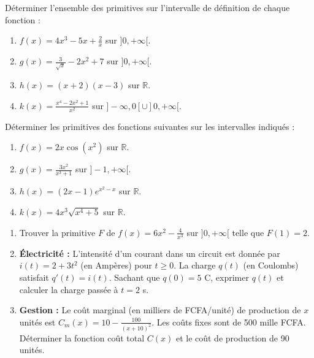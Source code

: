 \documentclass[11pt]{article}
\begin{document}
\begin{exercice}
Déterminer l'ensemble des primitives sur l'intervalle de définition de chaque fonction :
\begin{enumerate}
    \item $f(x) = 4x^3 - 5x + \frac{2}{x}$ sur $]0, +\infty[$.
    \item $g(x) = \frac{3}{\sqrt{x}} - 2x^2 + 7$ sur $]0, +\infty[$.
    \item $h(x) = (x+2)(x-3)$ sur $\mathbb{R}$.
    \item $k(x) = \frac{x^4 - 2x^2 + 1}{x^2}$ sur $]-\infty, 0[ \cup ]0, +\infty[$.
\end{enumerate}
\end{exercice}

\begin{exercice}
Déterminer les primitives des fonctions suivantes sur les intervalles indiqués :
\begin{enumerate}
    \item $f(x) = 2x \cos(x^2)$ sur $\mathbb{R}$.
    \item $g(x) = \frac{3x^2}{x^3+1}$ sur $]-1, +\infty[$.
    \item $h(x) = (2x-1)e^{x^2-x}$ sur $\mathbb{R}$.
    \item $k(x) = 4x^3 \sqrt{x^4+5}$ sur $\mathbb{R}$.
\end{enumerate}
\end{exercice}

\begin{exercice}
\begin{enumerate}
    \item Trouver la primitive $F$ de $f(x) = 6x^2 - \frac{4}{x^3}$ sur $]0, +\infty[$ telle que $F(1) = 2$.
    \item \textbf{Électricité :} L'intensité d'un courant dans un circuit est donnée par $i(t) = 2 + 3t^2$ (en Ampères) pour $t \ge 0$. La charge $q(t)$ (en Coulombs) satisfait $q'(t) = i(t)$. Sachant que $q(0) = 5$ C, exprimer $q(t)$ et calculer la charge passée à $t=2$ s.
    \item \textbf{Gestion :} Le coût marginal (en milliers de FCFA/unité) de production de $x$ unités est $C_m(x) = 10 - \frac{100}{(x+10)^2}$. Les coûts fixes sont de 500 mille FCFA. Déterminer la fonction coût total $C(x)$ et le coût de production de 90 unités.
\end{enumerate}
\end{exercice}
\end{document}
